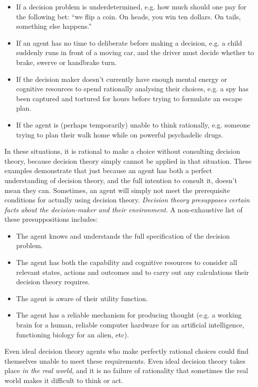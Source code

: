 \documentclass{article}
\begin{document}
\begin{itemize}  
\item If a decision problem is underdetermined, e.g. how much should one pay for the following bet: ``we flip a coin. On heads, you win ten dollars. On tails, something else happens.''
\item If an agent has no time to deliberate before making a decision, e.g. a child suddenly runs in front of a moving car, and the driver must decide whether to brake, swerve or handbrake turn.
\item If the decision maker doesn't currently have enough mental energy or cognitive resources to spend rationally analysing their choices, e.g. a spy has been captured and tortured for hours before trying to formulate an escape plan.
\item If the agent is (perhaps temporarily) unable to think rationally, e.g. someone trying to plan their walk home while on powerful psychadelic drugs.
\end{itemize}

In these situations, it is rational to make a choice without consulting decision theory, because decision theory simply cannot be applied in that situation. These examples demonstrate that just because an agent has both a perfect understanding of decision theory, and the full intention to consult it, doesn't mean they can. Sometimes, an agent will simply not meet the prerequisite conditions for actually using decision theory. \textit{Decision theory presupposes certain facts about the decision-maker and their environment}. A non-exhaustive list of these presuppositions includes:

\begin{itemize}  
\item The agent knows and understands the full specification of the decision problem.
\item The agent has both the capability and cognitive resources to consider all relevant states, actions and outcomes and to carry out any calculations their decision theory requires.
\item The agent is aware of their utility function.
\item The agent has a reliable mechanism for producing thought (e.g. a working brain for a human, reliable computer hardware for an artificial intelligence, functioning biology for an alien, etc).
\end{itemize}

Even ideal decision theory agents who make perfectly rational choices could find themselves unable to meet these requirements. Even ideal decision theory takes place \textit{in the real world}, and it is no failure of rationality that sometimes the real world makes it difficult to think or act.
\end{document}
